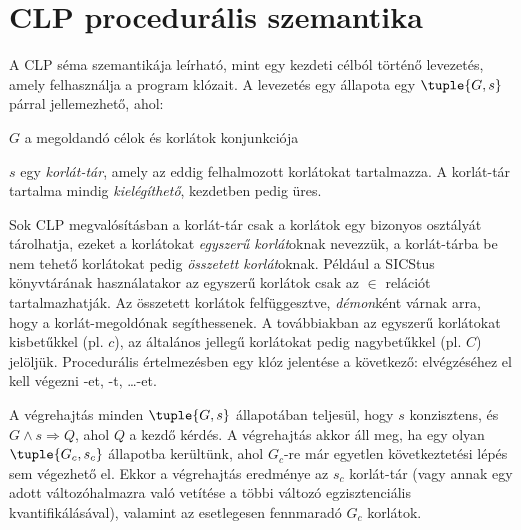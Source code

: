 \section{CLP procedurális szemantika}

A CLP séma szemantikája leírható, mint egy kezdeti célból történő levezetés,
amely felhasználja a program klózait. A levezetés egy állapota egy
$\tuple{G,s}$ párral jellemezhető, ahol:

\bul
\item $G$ a megoldandó célok és korlátok konjunkciója
\item $s$ egy \emph{korlát-tár}, amely az eddig felhalmozott korlátokat
tartalmazza. A korlát-tár tartalma mindig \emph{kielégíthető}, kezdetben
pedig üres.
\eul

Sok CLP megvalósításban a korlát-tár csak a korlátok egy bizonyos osztályát
tárolhatja, ezeket a korlátokat \emph{egyszerű korlát}oknak nevezzük,
a korlát-tárba be nem tehető korlátokat pedig \emph{összetett korlát}oknak.
Például a SICStus \clpfd könyvtárának használatakor az egyszerű korlátok csak az
$\in$ relációt tartalmazhatják. Az összetett korlátok felfüggesztve,
\emph{démon}ként várnak arra, hogy a korlát-megoldónak segíthessenek.
A továbbiakban az egyszerű korlátokat kisbetűkkel (pl. $c$), az általános
jellegű korlátokat pedig nagybetűkkel (pl. $C$) jelöljük.
\br
Procedurális értelmezésben egy  klóz jelentése
a következő:  elvégzéséhez el kell végezni -et, -t,
\dots {}-et.

A végrehajtás minden $\tuple{G,s}$ állapotában teljesül, hogy $s$ konzisztens,
és $G \land s \Rightarrow Q$, ahol $Q$ a kezdő kérdés. A végrehajtás akkor áll meg, ha
egy olyan $\tuple{G_c,s_c}$ állapotba kerültünk, ahol $G_c$-re már egyetlen
következtetési lépés sem végezhető el. Ekkor a végrehajtás eredménye az
$s_c$ korlát-tár (vagy annak egy adott változóhalmazra való vetítése
a többi változó egzisztenciális kvantifikálásával), valamint az esetlegesen
fennmaradó $G_c$ korlátok.

